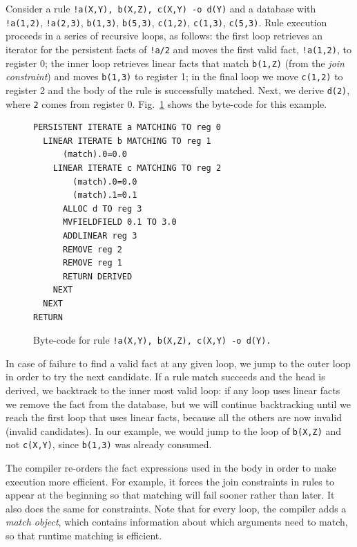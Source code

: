 Consider a rule \texttt{!a(X,Y), b(X,Z), c(X,Y) -o d(Y)} and a database with
\texttt{!a(1,2)}, \texttt{!a(2,3)}, \texttt{b(1,3)}, \texttt{b(5,3)}, \texttt{c(1,2)}, \texttt{c(1,3)},
\texttt{c(5,3)}. Rule execution proceeds in a series of recursive loops, as follows: the first loop retrieves an
iterator for the persistent facts of \texttt{!a/2} and moves the first valid fact, \texttt{!a(1,2)},
to register 0; the inner loop retrieves linear facts that match \texttt{b(1,Z)} (from the
\emph{join constraint}) and moves \texttt{b(1,3)} to register 1; in the final
loop we move \texttt{c(1,2)} to register 2 and the body of the rule is successfully matched. Next, we
derive \texttt{d(2)}, where \texttt{2} comes from register 0.
Fig.~\ref{fig:byte_code} shows the byte-code for this example.

\begin{figure}
   \vspace{-1\intextsep}
\scriptsize\begin{Verbatim}
PERSISTENT ITERATE a MATCHING TO reg 0
  LINEAR ITERATE b MATCHING TO reg 1
      (match).0=0.0
    LINEAR ITERATE c MATCHING TO reg 2
        (match).0=0.0
        (match).1=0.1
      ALLOC d TO reg 3
      MVFIELDFIELD 0.1 TO 3.0
      ADDLINEAR reg 3
      REMOVE reg 2
      REMOVE reg 1
      RETURN DERIVED
    NEXT
  NEXT
RETURN
\end{Verbatim}
\caption{\small{Byte-code for rule \texttt{!a(X,Y), b(X,Z), c(X,Y) -o d(Y).}}}
\label{fig:byte_code}
\vspace{-1\intextsep}
\end{figure}

In case of failure to find a valid fact at any given loop, we jump
to the outer loop in order to try the next candidate.
If a rule match succeeds and the head is derived, we backtrack to the inner most valid loop:
if any loop uses linear facts we remove the fact from the database, but we will
continue backtracking until we reach the first loop that uses linear facts,
because all the others are now invalid (invalid candidates). In our example, we would jump to the
loop of \texttt{b(X,Z)} and not \texttt{c(X,Y)}, since \texttt{b(1,3)} was already consumed.

The compiler re-orders the fact expressions used in the body in order to make execution more
efficient. For example, it forces the join constraints in rules to appear at the beginning so
that matching will fail sooner rather than later. It also does the same for constraints.
Note that for every loop, the compiler adds a \emph{match object}, which contains information
about which arguments need to match, so that runtime matching is efficient.


